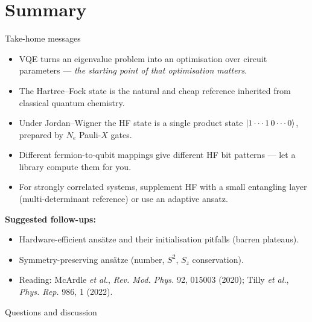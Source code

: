\documentclass[10pt,aspectratio=169]{beamer}
\begin{document}
\section{Summary}

\begin{frame}{Take-home messages}
\begin{itemize}
  \item VQE turns an eigenvalue problem into an optimisation over circuit parameters — \emph{the starting point of that optimisation matters}.
  \item The Hartree--Fock state is the natural and cheap reference inherited from classical quantum chemistry.
  \item Under Jordan--Wigner the HF state is a single product state $\ket{1\cdots1\,0\cdots0}$, prepared by $N_e$ Pauli-$X$ gates.
  \item Different fermion-to-qubit mappings give different HF bit patterns — let a library compute them for you.
  \item For strongly correlated systems, supplement HF with a small entangling layer (multi-determinant reference) or use an adaptive ansatz.
\end{itemize}

\bigskip
\textbf{Suggested follow-ups:}
\begin{itemize}
  \item Hardware-efficient ansätze and their initialisation pitfalls (barren plateaus).
  \item Symmetry-preserving ansätze (number, $S^2$, $S_z$ conservation).
  \item Reading: McArdle \emph{et al.}, \emph{Rev. Mod. Phys.} 92, 015003 (2020); Tilly \emph{et al.}, \emph{Phys. Rep.} 986, 1 (2022).
\end{itemize}
\end{frame}

\begin{frame}{}
\centering
\Large Questions and discussion
\end{frame}
\end{document}
